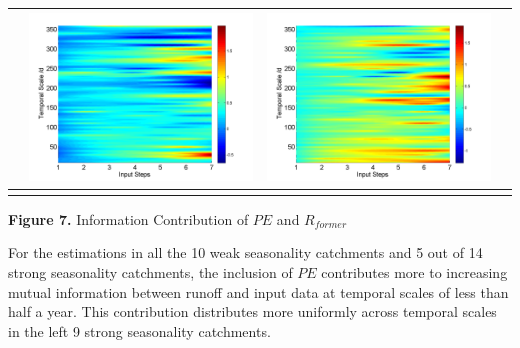 \documentclass[review]{elsarticle}
\begin{document}
\begin{table}[H]
\begin{tabular}{cccc}
&\begin{minipage}{.3\textwidth}\includegraphics[width=\linewidth]{resultgraph/06810000diff_ep.png}\end{minipage}
&\begin{minipage}{.3\textwidth}\includegraphics[width=\linewidth]{resultgraph/06810000diff_q.png}\end{minipage}
\\
\hline
\\
\end{tabular}
\Large{\textbf{Figure 7.} Information Contribution of $PE$ and $R_{former}$ }
\end{table}

For the estimations in all the 10 weak seasonality catchments and 5 out of 14 strong seasonality catchments, the inclusion of $PE$  contributes more to increasing mutual information between runoff and input data at temporal scales of less than half a year. This contribution distributes more uniformly across temporal scales in the left 9 strong seasonality catchments. 
\end{document}
